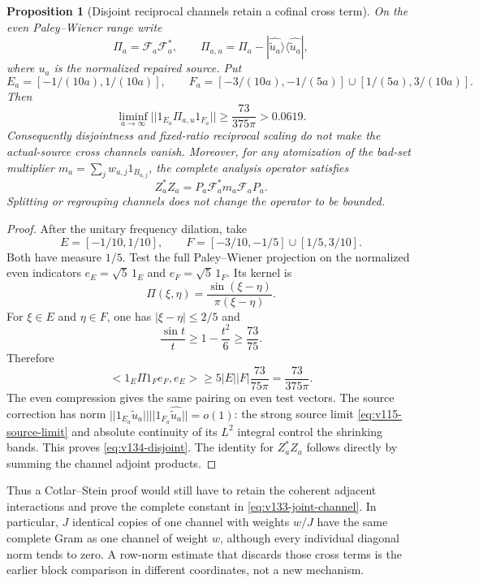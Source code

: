\documentclass[11pt]{article}
\def\norm#1{||#1||}%
\def\ip#1#2{<#1,#2>}%
\newtheorem{proposition}[theorem]{Proposition}
\theoremstyle{remark}
\newcommand{\norm}[1]{\left\lVert #1\right\rVert}
\newcommand{\ip}[2]{\left\langle #1,#2\right\rangle}
\begin{document}
\begin{proposition}[Disjoint reciprocal channels retain a cofinal cross term]
\label{prop:v134-disjoint}
On the even Paley--Wiener range write
\[
 \Pi_a=\mathcal F_a\mathcal F_a^*,\qquad
 \Pi_{a,u}=\Pi_a-|\widehat{\widetilde u_a}\rangle
                    \langle\widehat{\widetilde u_a}|,
\]
where $u_a$ is the normalized repaired source.  Put
\[
 E_a=[-1/(10a),1/(10a)],\qquad
 F_a=[-3/(10a),-1/(5a)]\cup[1/(5a),3/(10a)].
\]
Then
\begin{equation}
 \liminf_{a\to\infty}
 \norm{1_{E_a}\Pi_{a,u}1_{F_a}}
 \ge \frac{73}{375\pi}>0.0619.                 \label{eq:v134-disjoint}
\end{equation}
Consequently disjointness and fixed-ratio reciprocal scaling do not
make the actual-source cross channels vanish.  Moreover, for any
atomization of the bad-set multiplier
$m_a=\sum_jw_{a,j}1_{B_{a,j}}$, the complete analysis operator satisfies
\[
 Z_a^*Z_a=P_a\mathcal F_a^*m_a\mathcal F_aP_a.
\]
Splitting or regrouping channels does not change the operator to be
bounded.
\end{proposition}
\begin{proof}
After the unitary frequency dilation, take
\[
 E=[-1/10,1/10],\qquad
 F=[-3/10,-1/5]\cup[1/5,3/10].
\]
Both have measure $1/5$.  Test the full Paley--Wiener projection on the
normalized even indicators $e_E=\sqrt5\,1_E$ and
$e_F=\sqrt5\,1_F$.  Its kernel is
\[
 \Pi(\xi,\eta)=\frac{\sin(\xi-\eta)}{\pi(\xi-\eta)}.
\]
For $\xi\in E$ and $\eta\in F$, one has
$|\xi-\eta|\le2/5$ and
\[
 \frac{\sin t}{t}\ge1-\frac{t^2}{6}\ge\frac{73}{75}.
\]
Therefore
\[
 \ip{1_E\Pi1_Fe_F}{e_E}
 \ge 5|E||F|\frac{73}{75\pi}
 =\frac{73}{375\pi}.
\]
The even compression gives the same pairing on even test vectors.
The source correction has norm
$\norm{1_{E_a}\widehat{\widetilde u_a}}
 \norm{1_{F_a}\widehat{\widetilde u_a}}=o(1)$:
the strong source limit \eqref{eq:v115-source-limit} and absolute
continuity of its $L^2$ integral control the shrinking bands.  This
proves \eqref{eq:v134-disjoint}.  The identity for $Z_a^*Z_a$ follows
directly by summing the channel adjoint products.
\end{proof}

Thus a Cotlar--Stein proof would still have to retain the coherent
adjacent interactions and prove the complete constant in
\eqref{eq:v133-joint-channel}.  In particular, $J$ identical copies of
one channel with weights $w/J$ have the same complete Gram as one
channel of weight $w$, although every individual diagonal norm tends
to zero.  A row-norm estimate that discards those cross terms is the
earlier block comparison in different coordinates, not a new
mechanism.
\end{document}
